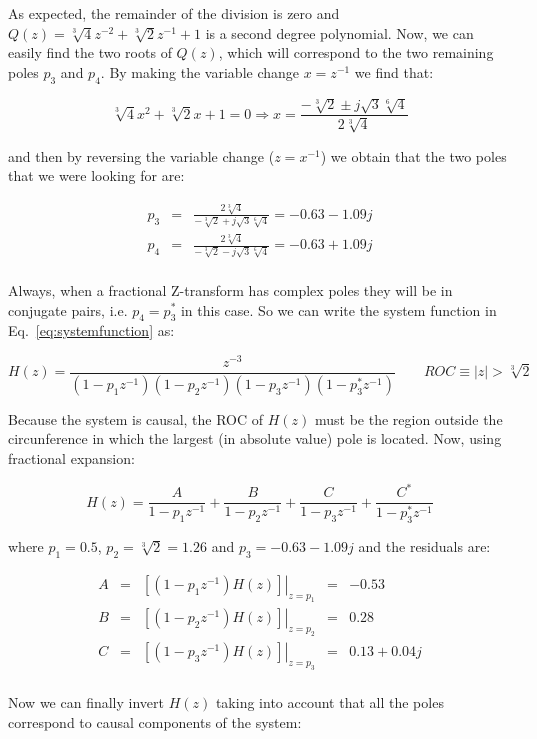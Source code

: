 \documentclass[a4paper,11pt,oneside]{article}
\begin{document}
As expected, the remainder of the division is zero and $Q(z)=\sqrt[3]{4}z^{-2}+\sqrt[3]{2}z^{-1}+1$ is a second degree polynomial. Now, we can easily find the two roots of $Q(z)$, which will correspond to the two remaining poles $p_3$ and $p_4$. By making the variable change $x=z^{-1}$ we find that:

\[
\sqrt[3]{4}x^{2}+\sqrt[3]{2}x+1=0 \Rightarrow x = \frac{-\sqrt[3]{2}\pm j\sqrt{3}\sqrt[6]{4}}{2\sqrt[3]{4}}
\]

and then by reversing the variable change ($z=x^{-1}$) we obtain that the two poles that we were looking for are:

\[
\begin{array}{lllll}
p_3&=& \frac{2\sqrt[3]{4}}{-\sqrt[3]{2}+ j\sqrt{3}\sqrt[6]{4}}=-0.63-1.09j\\
p_4&=& \frac{2\sqrt[3]{4}}{-\sqrt[3]{2}- j\sqrt{3}\sqrt[6]{4}}=-0.63+1.09j\\
\end{array}
\]

Always, when a fractional Z-transform has complex poles they will be in conjugate pairs, i.e. $p_4=p_3^*$ in this case. So we can write the system function in Eq.~\ref{eq:systemfunction} as:

\[
H(z)=\frac{z^{-3}}{(1-p_1z^{-1})(1-p_2z^{-1})(1-p_3z^{-1})(1-p_3^*z^{-1})} \qquad ROC \equiv |z|>\sqrt[3]{2}
\]

Because the system is causal, the ROC of $H(z)$ must be the region outside the circunference in which the largest (in absolute value) pole is located. Now, using fractional expansion:

\[
H(z) =  \frac{A}{1-p_1z^{-1}}+\frac{B}{1-p_2z^{-1}}+\frac{C}{1-p_3z^{-1}}+\frac{C^*}{1-p_3^*z^{-1}}
\]

where $p_1=0.5$, $p_2=\sqrt[3]{2}=1.26$ and $p_3=-0.63-1.09j$ and the residuals are:

\begin{equation}
\begin{array}{lllll}
A &=& \left.\left[(1-p_1z^{-1})H(z)\right]\right|_{z=p_1}&=&-0.53\\
B &=& \left.\left[(1-p_2z^{-1})H(z)\right]\right|_{z=p_2}&=&0.28\\
C &=& \left.\left[(1-p_3z^{-1})H(z)\right]\right|_{z=p_3}&=&0.13+0.04j\\
\end{array}
\end{equation}

Now we can finally invert $H(z)$ taking into account that all the poles correspond to causal components of the system:
\end{document}

